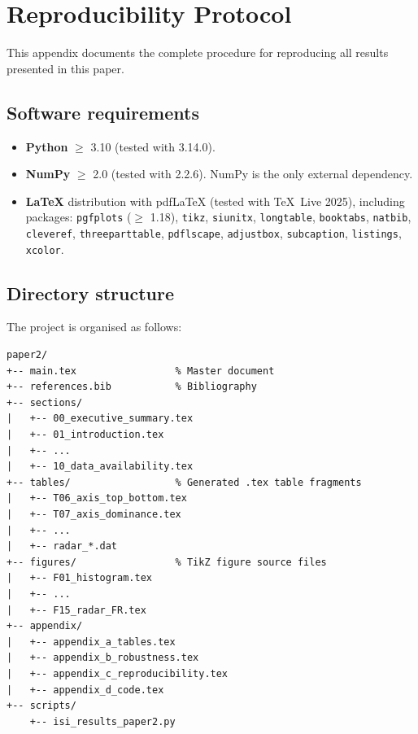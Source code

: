 \section{Reproducibility Protocol}\label{app:reproducibility}

This appendix documents the complete procedure for reproducing all
results presented in this paper.

\subsection{Software requirements}

\begin{itemize}[leftmargin=2em]
  \item \textbf{Python} $\geq$ 3.10 (tested with 3.14.0).
  \item \textbf{NumPy} $\geq$ 2.0 (tested with 2.2.6).
    NumPy is the only external dependency.
  \item \textbf{LaTeX} distribution with pdfLaTeX (tested with
    TeX~Live 2025), including packages: \texttt{pgfplots} ($\geq$
    1.18), \texttt{tikz}, \texttt{siunitx}, \texttt{longtable},
    \texttt{booktabs}, \texttt{natbib}, \texttt{cleveref},
    \texttt{threeparttable}, \texttt{pdflscape}, \texttt{adjustbox},
    \texttt{subcaption}, \texttt{listings}, \texttt{xcolor}.
\end{itemize}

\subsection{Directory structure}

The project is organised as follows:

\begin{verbatim}
paper2/
+-- main.tex                 % Master document
+-- references.bib           % Bibliography
+-- sections/
|   +-- 00_executive_summary.tex
|   +-- 01_introduction.tex
|   +-- ...
|   +-- 10_data_availability.tex
+-- tables/                  % Generated .tex table fragments
|   +-- T06_axis_top_bottom.tex
|   +-- T07_axis_dominance.tex
|   +-- ...
|   +-- radar_*.dat
+-- figures/                 % TikZ figure source files
|   +-- F01_histogram.tex
|   +-- ...
|   +-- F15_radar_FR.tex
+-- appendix/
|   +-- appendix_a_tables.tex
|   +-- appendix_b_robustness.tex
|   +-- appendix_c_reproducibility.tex
|   +-- appendix_d_code.tex
+-- scripts/
    +-- isi_results_paper2.py
\end{verbatim}

